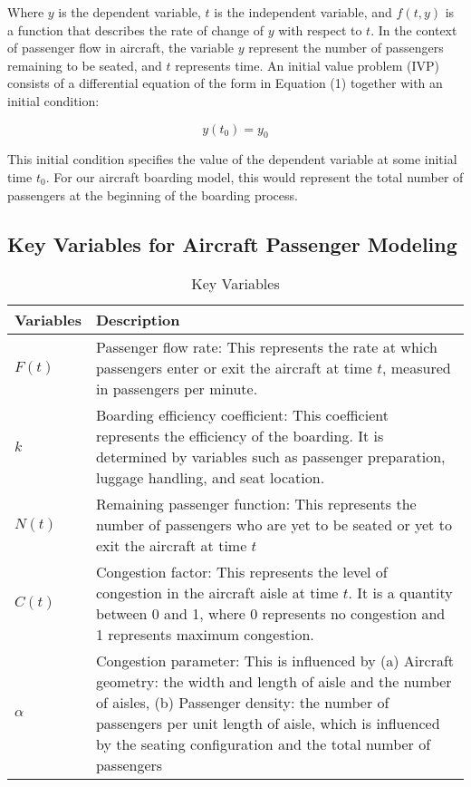 \documentclass[12pt]{article}
\begin{document}
Where $y$ is the dependent variable, $t$ is the independent variable, and $f(t, y)$ is a function that describes the rate of change of $y$ with respect to $t$. In the context of passenger flow in aircraft, the variable $y$ represent the number of passengers remaining to be seated, and $t$ represents time. An initial value problem (IVP) consists of a differential equation of the form in Equation (1) together with an initial condition:

\begin{equation}
y(t_0) = y_0
\end{equation}

This initial condition specifies the value of the dependent variable at some initial time $t_0$. For our aircraft boarding model, this would represent the total number of passengers at the beginning of the boarding process.

\subsection{Key Variables for Aircraft Passenger Modeling}

\begin{table}[h]
\centering
\caption{Key Variables}
\begin{tabular}{p{}p{}}
\toprule
\textbf{Variables} & \textbf{Description} \\
\midrule
$F(t)$ & Passenger flow rate: This represents the rate at which passengers enter or exit the aircraft at time $t$, measured in passengers per minute. \\
\addlinespace
$k$ & Boarding efficiency coefficient: This coefficient represents the efficiency of the boarding. It is determined by variables such as passenger preparation, luggage handling, and seat location. \\
\addlinespace
$N(t)$ & Remaining passenger function: This represents the number of passengers who are yet to be seated or yet to exit the aircraft at time $t$ \\
\addlinespace
$C(t)$ & Congestion factor: This represents the level of congestion in the aircraft aisle at time $t$. It is a quantity between 0 and 1, where 0 represents no congestion and 1 represents maximum congestion. \\
\addlinespace
$\alpha$ & Congestion parameter: This is influenced by (a) Aircraft geometry: the width and length of aisle and the number of aisles, (b) Passenger density: the number of passengers per unit length of aisle, which is influenced by the seating configuration and the total number of passengers \\
\bottomrule
\end{tabular}
\label{tab:variables}
\end{table}
\end{document}
